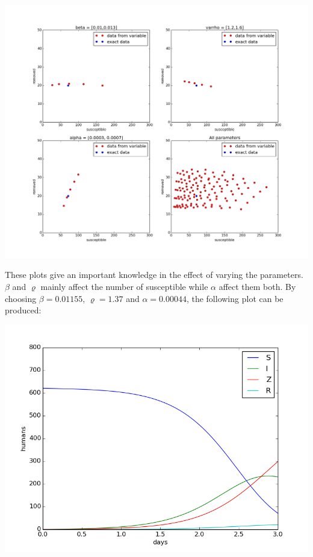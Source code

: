 \documentclass[%
twoside,                 %
final,                   %
10pt]{article}
\begin{document}
\begin{center}  %
  \centerline{\includegraphics[width=0.9\linewidth]{plots/check_parameters.png}}
\end{center}


These plots give an important knowledge in the effect of varying the parameters. $\beta$ and $\varrho$ mainly affect the number of susceptible while $\alpha$ affect them both. By choosing $\beta = 0.01155$, $\varrho=1.37$ and $\alpha=0.00044$, the following plot can be produced:  


\begin{center}  %
  \centerline{\includegraphics[width=0.9\linewidth]{plots/WD_zombie_initial_2.png}}
\end{center}
\end{document}
